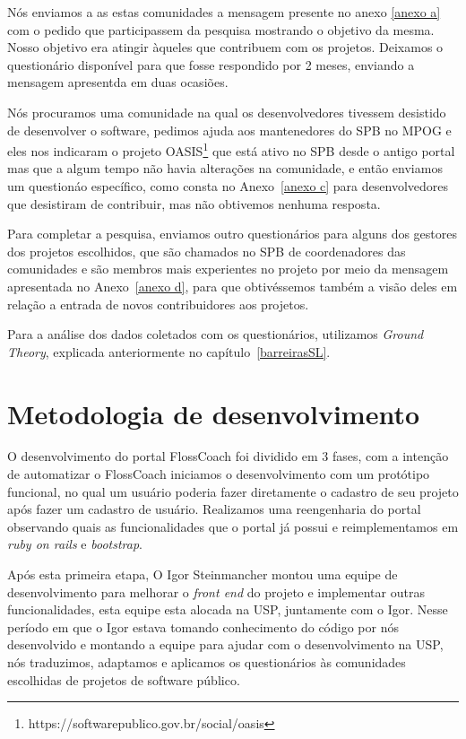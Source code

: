 Nós enviamos a as estas comunidades a mensagem presente no anexo \ref{anexo a}
com o pedido que participassem da pesquisa mostrando o objetivo da mesma. Nosso objetivo 
era atingir àqueles que contribuem com os projetos. Deixamos o questionário disponível 
para que fosse respondido por 2 meses, enviando a mensagem apresentda em duas ocasiões.

Nós procuramos uma comunidade na qual os desenvolvedores tivessem desistido
de desenvolver o software, pedimos ajuda aos mantenedores do SPB no MPOG e eles nos 
indicaram o projeto OASIS\footnote{https://softwarepublico.gov.br/social/oasis} que 
está ativo no SPB desde o antigo portal mas que a algum tempo não havia alterações
na comunidade, e então enviamos um questionáo específico, como consta no Anexo~\ref{anexo c} 
para desenvolvedores que desistiram de contribuir, mas não obtivemos nenhuma resposta. 

Para completar a pesquisa, enviamos outro questionários para alguns dos gestores dos
projetos escolhidos, que são chamados no SPB de coordenadores das comunidades e 
são membros mais experientes no projeto por meio da mensagem apresentada no Anexo~\ref{anexo d}, 
para que obtivéssemos também a visão deles em relação a entrada de novos contribuidores aos projetos. 

Para a análise dos dados coletados com os questionários, utilizamos \textit{Ground Theory}, 
explicada anteriormente no capítulo~\ref{barreirasSL}.

\section{Metodologia de desenvolvimento}

O desenvolvimento do portal FlossCoach foi dividido em 3 fases, com a intenção de 
automatizar o FlossCoach iniciamos o desenvolvimento com um protótipo funcional, no qual 
um usuário poderia fazer diretamente o cadastro de seu projeto após fazer um cadastro de 
usuário. Realizamos uma reengenharia do portal observando quais as funcionalidades 
que o portal já possui e reimplementamos em \textit{ruby on rails} e \textit{bootstrap}.

Após esta primeira etapa, O Igor Steinmancher montou uma equipe de desenvolvimento 
para melhorar o \textit{front end} do projeto e implementar outras funcionalidades, 
esta equipe esta alocada na USP, juntamente com o Igor. Nesse período em que o Igor 
estava tomando conhecimento do código por nós desenvolvido e montando a equipe para
ajudar com o desenvolvimento na USP, nós traduzimos, adaptamos e aplicamos os questionários
às comunidades escolhidas de projetos de software público.

